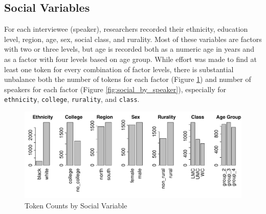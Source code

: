 \documentclass[a4paper]{article}
\begin{document}
\subsection*{Social Variables}
For each interviewee (speaker), researchers recorded their ethnicity,
education level, region, age, sex, social class, and rurality.  Most
of these variables are factors with two or three levels, but age is
recorded both as a numeric age in years and as a factor with four levels based on
age group.  While effort was made to find at least one token for every
combination of factor levels, there is substantial unbalance both the
number of tokens for each factor (Figure \ref{fig:social_by_token}) and
number of speakers for each factor (Figure
\ref{fig:social_by_speaker}), especially for \texttt{ethnicity},
\texttt{college}, \texttt{rurality}, and \texttt{class}.\\
\vspace{-5pt}
\begin{figure}[ht]
  \vspace{-5pt}
  \begin{center}
\includegraphics{prelim-005}
  \end{center}
  \vspace{-20pt}
  \caption{Token Counts by Social Variable}
  \label{fig:social_by_token}
\end{figure}
\end{document}
